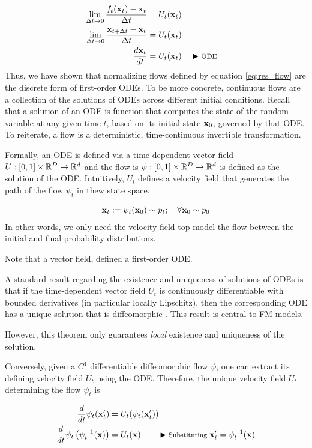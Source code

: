\documentclass[a4paper, 11pt]{article}
\begin{document}
\begin{align}\label{eq:flow_ode}
    \lim_{\Delta t \to 0} \frac{f_t(\mbox{$\mbox{$\mathbf{x}$}$}_t) - \mbox{$\mbox{$\mathbf{x}$}$}_t}{\Delta t} &= U_t(\mbox{$\mbox{$\mathbf{x}$}$}_t)\\
    \lim_{\Delta t \to 0} \frac{ \mbox{$\mbox{$\mathbf{x}$}$}_{t + \Delta t} - \mbox{$\mbox{$\mathbf{x}$}$}_t}{\Delta t} &= U_t(\mbox{$\mbox{$\mathbf{x}$}$}_t) \\ 
    \frac{d \mbox{$\mbox{$\mathbf{x}$}$}_t}{dt} &= U_t(\mbox{$\mbox{$\mathbf{x}$}$}_t) && \blacktriangleright\text{\footnotesize ODE}
\end{align}
Thus, we have shown that normalizing flows defined by equation \eqref{eq:res_flow} are the discrete form of first-order ODEs. To be more concrete, continuous flows are a collection of the solutions of ODEs across different initial conditions. Recall that a solution of an ODE is function that computes the state of the random variable at any given time $t$, based on its initial state $\mbox{$\mbox{$\mathbf{x}$}$}_0$, governed by that ODE. To reiterate, a flow is a deterministic, time-continuous invertible transformation.
   

Formally, an ODE is defined via a time-dependent vector field $U:[0, 1] \times \mathbb{R}^D \to \mathbb{R}^d$ and the flow is $\psi:[0,1] \times \mathbb{R}^D \to \mathbb{R}^d$ is defined as the solution of the ODE. Intuitively, $U_t$ defines a velocity field that generates the path of the flow $\psi_t$ in thew state space. 

\begin{align}
    \mbox{$\mbox{$\mathbf{x}$}$}_t := \psi_t(\mbox{$\mbox{$\mathbf{x}$}$}_0) \sim p_t; \quad \forall \mbox{$\mbox{$\mathbf{x}$}$}_0 \sim p_0
\end{align}
In other words, we only need the velocity field top model the flow between the initial and final probability distributions.

Note that a vector field, defined a first-order ODE.

A standard result regarding the existence and uniqueness of solutions of ODEs is that if the time-dependent vector field $U_t$ is continuously differentiable with bounded derivatives (in particular locally Lipschitz), then the corresponding ODE has a unique solution that is diffeomorphic \citep{perko2013differential}. This result is central to FM models. 

However, this theorem only guarantees \textit{local} existence and uniqueness of the solution. 

Conversely, given a $C^1$ differentiable diffeomorphic flow $\psi$, one can extract its defining velocity field $U_t$ using the ODE. Therefore, the unique velocity field $U_t$ determining the flow $\psi_t$ is 

\begin{align}
    \frac{d}{dt}\psi_t(\mbox{$\mbox{$\mathbf{x}$}$}'_t) &= U_t(\psi_t(\mbox{$\mbox{$\mathbf{x}$}$}'_t))\\
    \frac{d}{dt}\psi_t \left (\psi_t^{-1}(\mbox{$\mbox{$\mathbf{x}$}$}) \right) &= U_t(\mbox{$\mbox{$\mathbf{x}$}$}) \qquad \blacktriangleright\text{\footnotesize Substituting }\mbox{$\mbox{$\mathbf{x}$}$}'_t = \psi_t^{-1}(\mbox{$\mbox{$\mathbf{x}$}$})
\end{align}
\end{document}
